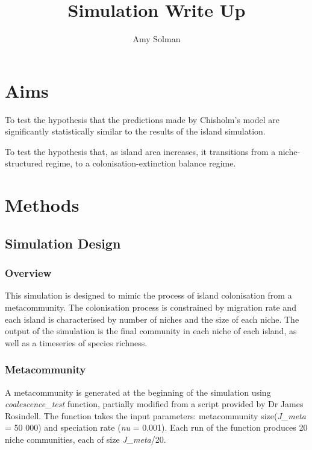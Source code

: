 \documentclass{article}
\begin{document}
\title{Simulation Write Up{}}
\author{Amy Solman}

\maketitle

\section{Aims}
To test the hypothesis that the predictions made by Chisholm’s model are significantly statistically similar to the results of the island simulation. \bigskip

\noindent To test the hypothesis that, as island area increases, it transitions from a niche-structured regime, to a colonisation-extinction balance regime. 

\section{Methods}

\subsection{Simulation Design}

\subsubsection{Overview}
This simulation is designed to mimic the process of island colonisation from a metacommunity. The colonisation process is constrained by migration rate and each island is characterised by number of niches and the size of each niche. The output of the simulation is the final community in each niche of each island, as well as a timeseries of species richness. 

\subsubsection{Metacommunity}
A metacommunity is generated at the beginning of the simulation using \textit{coalescence\_test} function, partially modified from a script provided by Dr James Rosindell. The function takes the input parameters: metacommunity size(\textit{J\_meta} = 50 000) and speciation rate (\textit{nu} = 0.001). Each run of the function produces 20 niche communities, each of size \textit{J\_meta}/20.  \bigskip
\end{document}
